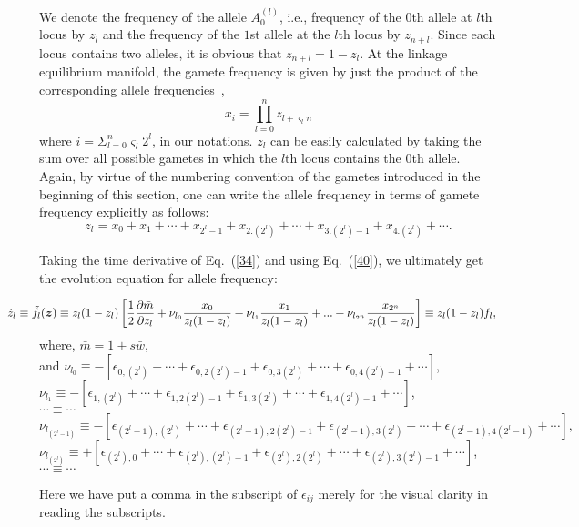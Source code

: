 \documentclass[
 pre,
 aps,
 a4paper,
 english,
 showkeys,
 reprint,
 twocolumn,
 superscriptaddress
]{revtex4}
\begin{document}
We denote the frequency of the allele $A_0^{(l)}$, i.e., frequency of the $0$th allele at $l$th locus by $z_l$ and the frequency of the $1$st allele at the $l$th locus by $z_{n+l}$. Since each locus contains two alleles, it is obvious that $z_{n+l}=1-z_l$. At the linkage equilibrium manifold, the gamete frequency is given by just the product of the corresponding allele frequencies~\cite{nagylaki1999JMB}, 
\begin{equation}x_i=\prod_{l=0}^{n}z_{l+\varsigma_ln}\end{equation} where $i=\Sigma_{l=0}^n\varsigma_l2^l$,
 in our notations. $z_{l}$ can be easily calculated by taking the sum over all possible gametes in which the $l$th locus contains the $0$th allele.  Again, by virtue of the numbering convention of the gametes introduced in the beginning of this section, one can write the allele frequency in terms of gamete frequency explicitly as follows:
\begin{equation}\label{34}
z_l=x_0+x_1+\cdots+x_{2^l-1}+x_{2.{(2^l)}}+\cdots+x_{3.{(2^l)}-1}+x_{4.{(2^l)}}+\cdots.\end{equation}


Taking the time derivative of Eq.~(\ref{34}) and using Eq.~(\ref{40}), we ultimately get the evolution equation for allele frequency:
\begin{widetext} 
	\begin{equation}
	\label{12}
	\hspace*{-10mm}	\dot{z}_{l}\equiv \tilde{f}_{l}(\boldsymbol{z})\equiv z_{l}(1-z_{l})\left[\frac{1}{2}\frac{\partial \bar{m}}{\partial z_{l}}  + \nu_{{l}_{0}}\frac{x_0}{z_{l}(1-z_{l})}+ \nu_{{l}_1}\frac{x_1}{z_{l}(1-z_{l})}+...+\nu_{{l}_{2^n}}\frac{x_{2^n}}{z_{l}(1-z_{l})}\right]\equiv z_{l}(1-z_{l})f_{l},%
	\end{equation}
where, $\bar{m}=1+s \bar{w}$,\\ and \hspace*{3mm} $\nu_{l_0}\equiv-\left[\epsilon_{0,(2^l)}+\cdots+\epsilon_{0,2(2^l)-1}+\epsilon_{0,3(2^l)}+\cdots+\epsilon_{0,4(2^l)-1}+\cdots\right]$,\\ \hspace*{10mm} $\nu_{l_1}\equiv-\left[\epsilon_{1,(2^l)}+\cdots+\epsilon_{1,2(2^l)-1}+\epsilon_{1,3(2^l)}+\cdots+\epsilon_{1,4(2^l)-1}+\cdots\right]$,\\\hspace*{11.0mm}$\cdots\equiv \cdots$\\\hspace*{5.0mm}$\nu_{l_{(2^l-1)}}\equiv-\left[\epsilon_{{(2^l-1)},(2^l)}+\cdots+\epsilon_{{(2^l-1)},2(2^l)-1}+\epsilon_{{(2^l-1)},3(2^l)}+\cdots+\epsilon_{{(2^l-1)},4(2^l-1)}+\cdots\right],$\\\hspace*{6.0mm} $\nu_{l_{(2^l)}}\equiv+\left[\epsilon_{(2^l),0}+\cdots+\epsilon_{(2^l),(2^l)-1}+\epsilon_{(2^l),2(2^l)}+\cdots+\epsilon_{(2^l),3(2^l)-1}+\cdots\right]$,\\ \hspace*{11.0mm}$\cdots \equiv \cdots$
\end{widetext}
Here we have put a comma in the subscript of $\epsilon_{ij}$ merely for the visual clarity in reading the subscripts.
\end{document}
